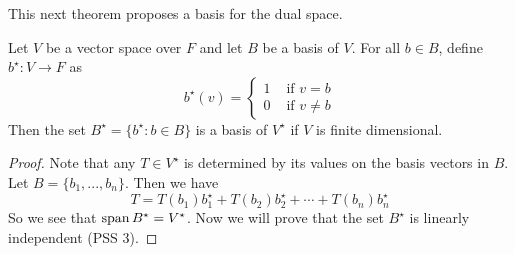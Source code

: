 \documentclass[main.tex]{subfiles}
\begin{document}
    This next theorem proposes a basis for the dual space. 
    \begin{thrm}{}{}
        Let $V$ be a vector space over $F$ and let $B$ be a basis of $V$. For all $b\in B$, define $b^\star : V\to F$ as 
        \begin{equation*}
            b^\star (v) = \begin{cases}
                1 & \text{ if } v = b \\
                0 & \text{ if } v \neq b
            \end{cases}
        \end{equation*}
        Then the set $B^\star = \{b^\star : b\in B\}$ is a basis of $V^\star$ if $V$ is finite dimensional.
    \end{thrm}
    \begin{proof}
        Note that any $T\in V^\star$ is determined by its values on the basis vectors in $B$. Let $B = \{b_1, ..., b_n\}$. Then we have 
        \begin{equation*}
            T = T(b_1)b_1^\star + T(b_2)b_2^\star + \cdots + T(b_n)b_n^\star 
        \end{equation*}
        So we see that $\operatorname{span} B^\star = V^\star$. Now we will prove that the set $B^\star$ is linearly independent (PSS 3). 
    \end{proof}
\end{document}

